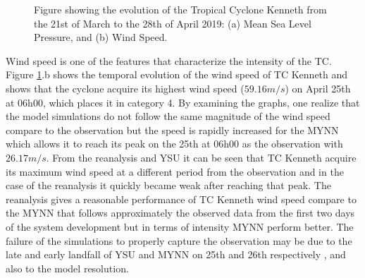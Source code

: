 \documentclass[8pt,a4paper]{article}
\begin{document}
	\begin{figure}[H] 
			\centering
		\caption{Figure showing the evolution of the Tropical Cyclone Kenneth from the 21st of March to the 28th of April 2019: (a) Mean Sea Level Pressure, and (b) Wind Speed.}
		\label{fig:4.2}
	\end{figure}
	
	
	Wind speed is one of the features that characterize the intensity of the TC. Figure \ref{fig:4.2}.b shows the temporal evolution of the wind speed of TC Kenneth and shows that the cyclone acquire its highest wind speed ($59.16 m/s$) on April 25th at 06h00, which places it in category 4. By examining the graphs, one realize that the model simulations do not follow the same magnitude of the wind speed compare to the observation but the speed is rapidly increased for the MYNN which allows it to reach its peak on the 25th at 06h00 as the observation with $26.17 m/s$. From the reanalysis and YSU it can be seen that TC Kenneth acquire its maximum wind speed at a different period from the observation and in the case of the reanalysis it quickly became weak after reaching that peak.
	The reanalysis gives a reasonable performance of TC Kenneth wind speed compare to the MYNN that follows approximately the observed data from the first two days of the system development but in terms of intensity MYNN perform better. The failure of the simulations to properly capture the observation may be due to the late and early landfall of YSU and MYNN on 25th  and 26th respectively , and also to the model resolution.
	
\end{document}
